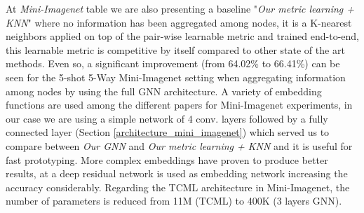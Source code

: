 \documentclass{article} \usepackage{iclr2018_conference,times}
\begin{document}
At \textit{Mini-Imagenet} table we are also presenting a baseline "\textit{Our metric learning + KNN}" where no information has been aggregated among nodes, it is a K-nearest neighbors applied on top of the pair-wise learnable metric  and trained end-to-end, this learnable metric is competitive by itself compared to other state of the art methods. Even so, a significant improvement (from 64.02\% to 66.41\%) can be seen for the 5-shot 5-Way Mini-Imagenet setting when aggregating information among nodes by using the full GNN architecture. A variety of embedding functions  are used among the different papers for Mini-Imagenet experiments, in our case we are using a simple network of 4 conv. layers followed by a fully connected layer (Section \ref{architecture_mini_imagenet}) which served us to compare between \textit{Our GNN} and \textit{Our metric learning + KNN} and it is useful for fast prototyping. More complex embeddings have proven to produce better results, at \cite{mishra2017meta} a deep residual network is used as embedding network  increasing the accuracy considerably. Regarding the TCML architecture in Mini-Imagenet, the number of parameters is reduced from 11M (TCML) to 400K (3 layers GNN).
\end{document}
